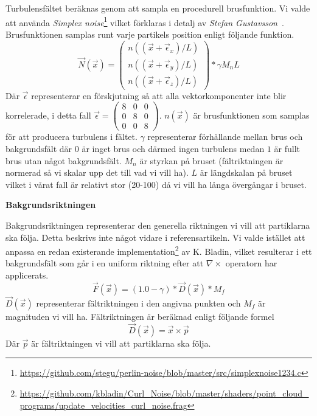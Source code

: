 \documentclass[a4paper]{article}
\begin{document}
\begin{multicols}{2}
    Turbulensfältet beräknas genom att sampla en procedurell brusfunktion. Vi valde att använda \textit{Simplex noise}\footnote{\url{https://github.com/stegu/perlin-noise/blob/master/src/simplexnoise1234.c}} vilket förklaras i detalj av \emph{Stefan Gustavsson}~\cite{gustavson2005simplex}. Brusfunktionen samplas runt varje partikels position enligt följande funktion.
    \begin{equation}
   \vec{N}(\vec{x}) =
        \begin{pmatrix}
        n((\vec{x} + \vec{\epsilon}_x)/L)
        \\
        n((\vec{x} + \vec{\epsilon}_y)/L)
        \\ 
        n((\vec{x} + \vec{\epsilon}_z)/L)
        \end{pmatrix} * \gamma M_nL
    \end{equation}
    Där $\vec{\epsilon}$ representerar en förskjutning så att alla vektorkomponenter inte blir korrelerade, i detta fall $\vec{\epsilon} = \begin{pmatrix}
8 & 0 & 0\\ 
0 & 8 & 0\\ 
0 & 0 & 8
\end{pmatrix}$. $n(\vec{x})$ är brusfunktionen som samplas för att producera turbulens i fältet. $\gamma$ representerar förhållande mellan brus och bakgrundsfält där $0$ är inget brus och därmed ingen turbulens medan $1$ är fullt brus utan något bakgrundsfält. $M_n$ är styrkan på bruset (fältriktningen är normerad så vi skalar upp det till vad vi vill ha). $L$ är längdskalan på bruset vilket i vårat fall är relativt stor (20-100) då vi vill ha långa övergångar i bruset.

\textbf{Bakgrundsriktningen}

Bakgrundsriktningen representerar den generella riktningen vi vill att partiklarna ska följa. Detta beskrivs inte något vidare i referensartikeln. Vi valde istället att anpassa en redan existerande implementation\footnote{\url{https://github.com/kbladin/Curl_Noise/blob/master/shaders/point_cloud_programs/update_velocities_curl_noise.frag}} av K. Bladin, vilket resulterar i ett bakgrundsfält som går i en uniform riktning efter att $\nabla \times$ operatorn har applicerats.
\begin{equation}
     \vec{F}(\vec{x}) = (1.0-\gamma) *  \vec{D}(\vec{x}) * M_f
\end{equation}
$ \vec{D}(\vec{x})$ representerar fältriktningen i den angivna punkten och $M_f$ är magnituden vi vill ha. Fältriktningen är beräknad enligt följande formel
\begin{equation}
    \vec{D}(\vec{x}) = \vec{x} \times \vec{p}
\end{equation}
Där $\vec{p}$ är fältriktningen vi vill att partiklarna ska följa.



\end{multicols}
\end{document}
